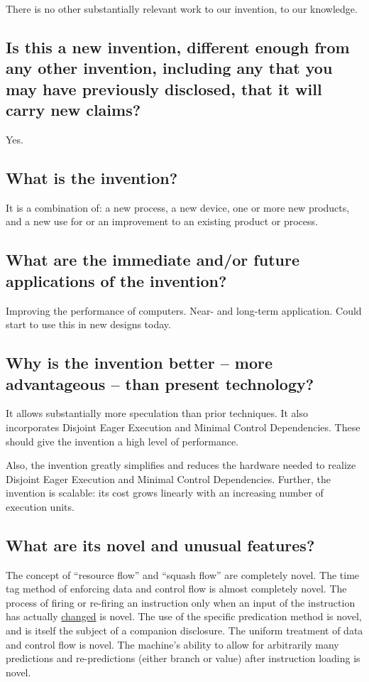 \documentclass[10pt,dvips]{article}
\begin{document}
There is no other substantially relevant work to our invention, to
our knowledge.







\subsection{Is this a new invention, different enough from any other invention,
including any that you may have previously disclosed, that it will carry new
claims?}
Yes. 

\subsection{What is the invention?}
It is a combination of: a new process, a new device, one or more new
products, and a new use for or
an improvement to an existing product or process.

\subsection{What are the immediate and/or future applications of the invention?}
Improving the performance of computers.
Near- and long-term application. Could start to use this in new designs today.

\subsection{Why is the invention better -- more advantageous -- than present technology?}
It allows substantially more speculation than prior techniques. It also incorporates
Disjoint Eager Execution and Minimal Control Dependencies. These should give the
invention a high level of performance.

Also, the invention greatly simplifies and reduces the hardware needed to realize
Disjoint Eager Execution and Minimal Control Dependencies. Further, the invention
is scalable: its cost grows linearly with an increasing number of execution
units.

\subsection{What are its novel and unusual features?}
The concept of ``resource flow'' and ``squash flow'' are completely novel.
The time tag method of enforcing data and control flow is almost completely
novel. The process of firing or re-firing an instruction only when an input
of the instruction has actually \underline{changed} is novel. The use of
the specific predication method is novel, and is itself the subject of a
companion disclosure. The uniform treatment of data and control flow is
novel. The machine's ability to allow for arbitrarily many
predictions and re-predictions
(either branch or value) after instruction loading is novel.
\end{document}
